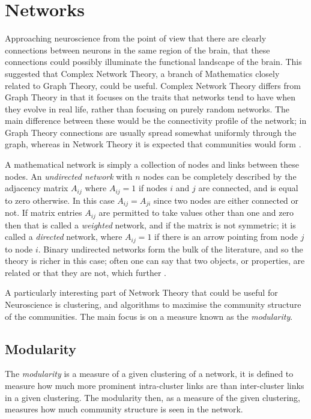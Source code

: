 
\section{Networks}

Approaching neuroscience from the point of view that there are
clearly connections between neurons in the same region of the brain,
that these connections could possibly illuminate the functional landscape of the
 brain.  This suggested that Complex Network Theory, a branch 
of Mathematics closely related to Graph Theory, could be useful. Complex Network Theory differs from 
Graph Theory in that it focuses on the traits that networks tend to have when they evolve in real life, rather than focusing on purely random networks.  
The main difference between these would be the connectivity profile of the 
network; in Graph Theory connections are usually spread somewhat uniformly 
through the graph, whereas in Network Theory it is  expected that communities would form \cite{Newman2010a}.

A mathematical network is simply a collection of nodes and links between
these nodes.  An \emph{undirected network} with $n$ nodes can be
completely described by the adjacency matrix $A_{ij}$ where $A_{ij} =
1$ if nodes $i$ and $j$ are connected, and is equal to zero otherwise. In this 
case $A_{ij} = A_{ji}$ since two nodes are either connected or
not.  If matrix entries $A_{ij}$ are permitted to take values other than one and zero
then that is called a \emph{weighted} network, and if the matrix is not symmetric; it is called a \emph{directed} network, where $A_{ij} = 1$ if there 
is an arrow pointing from node $j$ to node $i$.   Binary undirected networks form the bulk of the literature, and so the theory is richer
in this case; often one can say that two objects, or properties, are 
related or that they are not, which further .

A particularly interesting part of Network Theory that could be useful for
Neuroscience is clustering, and algorithms to maximise the community structure of the communities.  The main focus is on a measure known as the
\emph{modularity}.

\subsection{Modularity}

The \emph{modularity} is a measure of a given clustering of a network,  it is defined to measure how much more prominent
intra-cluster links are than inter-cluster links in a given
clustering. The modularity then, as a measure of the given clustering, measures how much community structure is seen in the network.  

